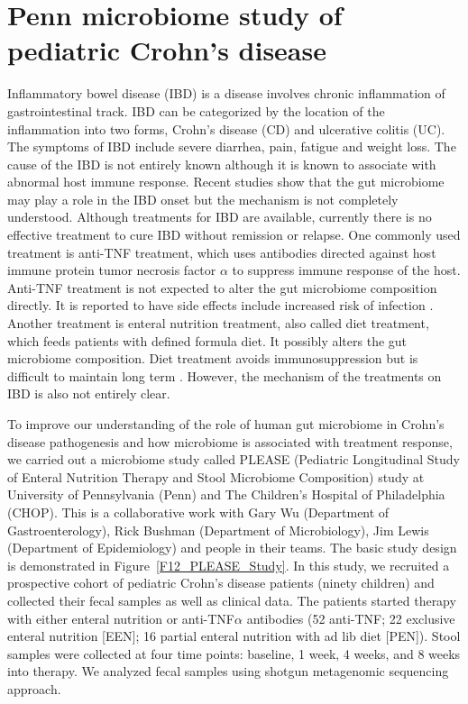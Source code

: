 \section{Penn microbiome study of pediatric Crohn's disease}
Inflammatory bowel disease (IBD) is a disease involves chronic inflammation of gastrointestinal track. IBD can be categorized by the location of the inflammation into two forms, Crohn's disease (CD) and ulcerative colitis (UC). The symptoms of IBD include severe diarrhea, pain, fatigue and weight loss. The cause of the IBD is not entirely known although it is known to associate with abnormal host immune response. Recent studies show that the gut microbiome may play a role in the IBD onset \citep{gevers2014treatment} but the mechanism is not completely understood. Although treatments for IBD are available, currently there is no effective treatment to cure IBD without remission or relapse. One commonly used treatment is anti-TNF treatment, which uses antibodies directed against host immune protein tumor necrosis factor $\alpha$ to suppress immune response of the host. Anti-TNF treatment is not expected to alter the gut microbiome composition directly. It is reported to have side effects include increased risk of infection \citep{Borrelli:2006tk, Rutgeerts:2012ul}. Another treatment is enteral nutrition treatment, also called diet treatment, which feeds patients with defined formula diet. It possibly alters the gut microbiome composition. Diet treatment avoids immunosuppression but is difficult to maintain long term \citep{Grover:2013dj}. However, the mechanism of the treatments on IBD is also not entirely clear.

To improve our understanding of the role of human gut microbiome in Crohn's disease pathogenesis and how microbiome is associated with treatment response, we carried out a microbiome study called PLEASE  (Pediatric Longitudinal Study of Enteral Nutrition Therapy and Stool Microbiome Composition) study at University of Pennsylvania (Penn) and The Children's Hospital of Philadelphia (CHOP). This is a collaborative work with Gary Wu (Department of Gastroenterology), Rick Bushman (Department of Microbiology), Jim Lewis (Department of Epidemiology) and people in their teams. The basic study design is demonstrated in Figure~\ref{F12_PLEASE_Study}.  In this study, we recruited a prospective cohort of pediatric Crohn's disease patients (ninety children) and collected their fecal samples as well as clinical data. The patients started therapy with either enteral nutrition or anti-TNF$\alpha$ antibodies (52 anti-TNF; 22 exclusive enteral nutrition [EEN]; 16 partial enteral nutrition with ad lib diet [PEN]). Stool samples were collected at four time points: baseline, 1 week, 4 weeks, and 8 weeks into therapy. We analyzed fecal samples using shotgun metagenomic sequencing approach.

